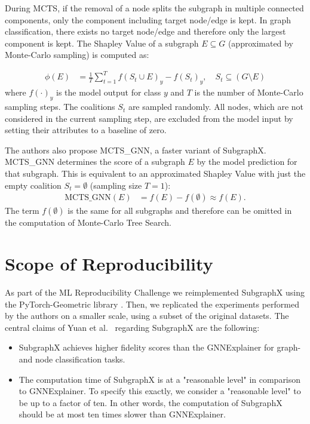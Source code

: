 During MCTS, if the removal of a node splits the subgraph in multiple connected components, only the component including target node/edge is kept. 
In graph classification, there exists no target node/edge and therefore only the largest component is kept. 
The Shapley Value of a subgraph $E \subseteq G$ (approximated by Monte-Carlo sampling) is computed as:

\begin{align}
\phi(E) &= \frac{1}{T} \sum_{t=1}^{T} f(S_t \cup E)_{y} - f(S_t)_{y}, \quad S_t \subseteq (G \setminus E)
\end{align}
where $f(\cdot)_y$ is the model output for class $y$ and $T$ is the number of Monte-Carlo sampling steps. 
The coalitions $S_t$ are sampled randomly. 
All nodes, which are not considered in the current sampling step, are excluded from the model input by setting their attributes to a baseline of zero.

The authors also propose MCTS\_GNN, a faster variant of SubgraphX. MCTS\_GNN determines the score of a subgraph $E$ by the model prediction for that subgraph. This is equivalent to an approximated Shapley Value with just the empty coalition $S_t = \emptyset$ (sampling size $T = 1$):
\begin{align}
\text{MCTS\_GNN}(E) &= f(E) - f(\emptyset) \approx f(E).
\end{align}
The term $f(\emptyset)$ is the same for all subgraphs and therefore can be omitted in the computation of Monte-Carlo Tree Search.

\section{Scope of Reproducibility}
\label{sec:claims}
As part of the ML Reproducibility Challenge we reimplemented SubgraphX using the PyTorch-Geometric library \cite{fey19}. Then, we replicated the experiments performed by the authors on a smaller scale, using a subset of the original datasets. The central claims of Yuan et al.\ \cite{Yuan21} regarding SubgraphX are the following:
\begin{itemize}
    \item SubgraphX achieves higher fidelity scores than the GNNExplainer for graph- and node classification tasks.
    \item The computation time of SubgraphX is at a "reasonable level" in comparison to GNNExplainer. To specify this exactly, we consider a "reasonable level" to be up to a factor of ten. In other words, the computation of SubgraphX should be at most ten times slower than GNNExplainer.
\end{itemize}

